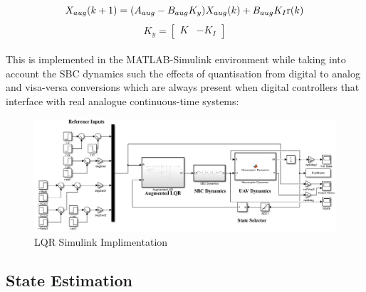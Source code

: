 \documentclass[12pt,a4paper,twoside]{report}
\begin{document}
				\begin{equation}
					X_{aug}(k+1) = (A_{aug} - B_{aug}K_{y}) X_{aug}(k) + B_{aug}K_I \emph{\emph{r}}(k)
				\end{equation}
				\[
					K_{y} =
					\begin{bmatrix}
						K & -K_{I}
					\end{bmatrix}
				\]
				\\
				This is implemented in the MATLAB-Simulink environment while taking into account the SBC dynamics such the effects of quantisation from digital to analog and visa-versa conversions which are always present when digital controllers that interface with real analogue continuous-time systems:
				\\
				\begin{figure}[h!]
					\centering
					\includegraphics[width=1\linewidth]{LQRSimulink.png}
					\caption{LQR Simulink Implimentation}
					\label{fig:lqrsimulinkimplimentation}
				\end{figure}
				
			\subsection{State Estimation}
			
\end{document}
